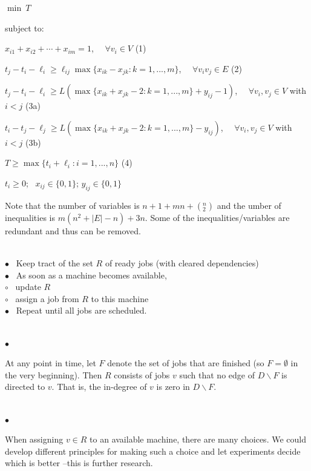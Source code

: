 \documentclass[10pt]{article}
\begin{document}
$\min \ T$

\vspace{-5pt}
subject to:

\vspace{-6pt}
\makebox[15pt]{} $x_{i1}+x_{i2}+ \cdots + x_{im}=1$, \ \ $\forall v_i\in V$
\hfill (1)

\vspace{-4pt}
\makebox[15pt]{} $t_j-t_i-\ell_i\ge \ell_{ij}\max\{x_{ik}-x_{jk}:k=1,...,m\}$, \
\ $\forall v_iv_j\in E$ \hfill (2)

\vspace{-4pt}
\makebox[15pt]{} $t_j-t_i-\ell_i\ge
L(\max\{x_{ik}+x_{jk}-2:k=1,...,m\}+y_{ij}-1)$, \ \ $\forall v_i,v_j\in V$ with
$i<j$ \hfill (3a)

\vspace{-4pt}
\makebox[15pt]{} $t_i-t_j-\ell_j\ge
L(\max\{x_{ik}+x_{jk}-2:k=1,...,m\}-y_{ij})$, \ \ $\forall v_i,v_j\in V$ with
$i<j$ \hfill (3b)

\vspace{-4pt}
\makebox[15pt]{} $T\ge \max\{t_i+\ell_i: i=1,...,n\}$ \hfill (4)

\vspace{-4pt}
\makebox[15pt]{} $t_i\ge0$; \ $x_{ij}\in\{0,1\}$; $y_{ij}\in\{0,1\}$

\noindent Note that the number of variables is $n+1+mn+(^n_2)$ and the umber of
inequalities is $m(n^2+|E|-n)+3n$. Some of the inequalities/variables are
redundant and thus can be removed.

 \\ 
\indent $\bullet$ \ Keep tract of the set $R$ of ready jobs (with cleared
dependencies) \\ 
\indent $\bullet$ \ As soon as a machine becomes available, \\ 
\makebox[9mm]{} $\circ$ \ update $R$\\ 
\makebox[9mm]{} $\circ$ \ assign a job from $R$ to this machine\\ 
\indent $\bullet$ \ Repeat until all jobs are scheduled. 

 \\ 
\indent $\bullet$ \ \parbox[t]{155mm}{At any point in time, let $F$ denote the
set of jobs that are finished (so $F=\emptyset$ in the very beginning). Then $R$
consists of jobs $v$ such that no edge of $D\backslash F$ is directed to $v$.
That is, the in-degree of $v$ is zero in $D\backslash F$.}\smallskip\\ 
\indent $\bullet$ \ \parbox[t]{155mm}{When assigning $v\in R$ 
to an available machine, there are many choices. We could develop different principles for making such a choice and let experiments decide which is better --this is further research. }
\end{document}
